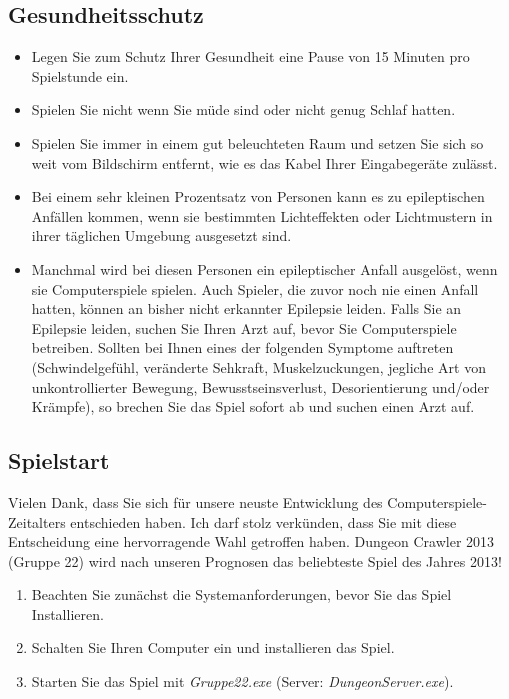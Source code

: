 \documentclass[12pt, a4paper]{scrreprt}
\begin{document}
\subsection*{Gesundheitsschutz}
\begin{itemize}
\item Legen Sie zum Schutz Ihrer Gesundheit eine Pause von 15 Minuten pro Spielstunde ein.
\item Spielen Sie nicht wenn Sie müde sind oder nicht genug Schlaf hatten.
\item Spielen Sie immer in einem gut beleuchteten Raum und setzen Sie sich so weit vom Bildschirm entfernt, wie es das Kabel Ihrer Eingabegeräte zulässt.
\item Bei einem sehr kleinen Prozentsatz von Personen kann es zu epileptischen Anfällen kommen, wenn sie bestimmten Lichteffekten oder Lichtmustern in ihrer täglichen Umgebung ausgesetzt sind.
\item Manchmal wird bei diesen Personen ein epileptischer Anfall ausgelöst, wenn sie Computerspiele spielen. Auch Spieler, die zuvor noch nie einen Anfall hatten, können an bisher nicht erkannter Epilepsie leiden. Falls Sie an Epilepsie leiden, suchen Sie Ihren Arzt auf, bevor Sie Computerspiele betreiben. Sollten bei Ihnen eines der folgenden Symptome auftreten (Schwindelgefühl, veränderte Sehkraft, Muskelzuckungen, jegliche Art von unkontrollierter Bewegung, Bewusstseinsverlust, Desorientierung und/oder Krämpfe), so brechen Sie das Spiel sofort ab und suchen einen Arzt auf.
\end{itemize}
\subsection*{Spielstart}
Vielen Dank, dass Sie sich für unsere neuste Entwicklung des Computerspiele-Zeitalters entschieden haben. Ich darf stolz verkünden, dass Sie mit diese Entscheidung eine hervorragende Wahl getroffen haben. Dungeon Crawler 2013 (Gruppe 22) wird nach unseren Prognosen das beliebteste Spiel des Jahres 2013!\\
\begin{enumerate}
\item Beachten Sie zunächst die Systemanforderungen, bevor Sie das Spiel Installieren.
\item Schalten Sie Ihren Computer ein und installieren das Spiel.
\item Starten Sie das Spiel mit \textit{Gruppe22.exe} (Server: \textit{DungeonServer.exe}).
\end{enumerate}
\end{document}
